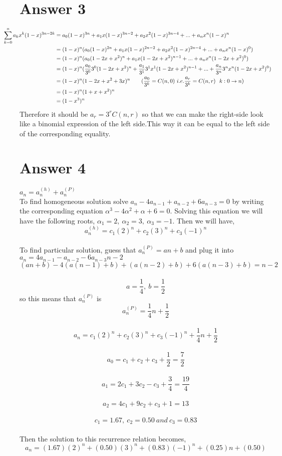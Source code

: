 \documentclass[12pt]{article}
\begin{document}
\section*{Answer 3}
\begin{equation} 
\begin{split}
\hspace{-1cm}
\sum\limits_{k=0}^{n}a_kx^k(1-x)^{3n-2k} 
& =a_0(1-x)^{3n}+a_1x(1-x)^{3n-2}+a_2x^2(1-x)^{3n-4}+...+a_nx^n(1-x)^n\\
& =(1-x)^n(a_0(1-x)^{2n}+a_1x(1-x)^{2n-2}+a_2x^2(1-x)^{2n-4}+...+a_nx^n(1-x)^0)\\
& =(1-x)^n(a_0(1-2x+x^2)^{n}+a_1x(1-2x+x^2)^{n-1}+...+a_nx^n(1-2x+x^2)^0)\\
& =(1-x)^n(\frac{a_0}{3^0}3^0(1-2x+x^2)^{n}+\frac{a_1}{3^1}3^1x^1(1-2x+x^2)^{n-1}+...+\frac{a_n}{3^n}3^nx^n(1-2x+x^2)^0)\\
& =(1-x)^n(1-2x+x^2+3x)^n \qquad (\frac{a_0}{3^k}=C(n,0)\ i.e. \frac{a_r}{3^k}=C(n,r)\ \ k:0 \rightarrow n)\\ 
& =(1-x)^n(1+x+x^2)^n \\
& =(1-x^3)^n 
\end{split}
\end{equation}
Therefore it should be $a_r=3^rC(n,r)$ so that we can make the right-side look like a binomial expression of the left side.This way it can be equal to the left side of the corresponding equality.
\section*{Answer 4}
\vspace{0.5cm}
$a_n=a_n^{(h)}+a_n^{(P)}$ \\
\vspace{0.1cm}
\hspace{1cm}
To find homogeneous solution solve $a_n-4a_{n-1}+a_{n-2}+6a_{n-3}=0$ by writing the corresponding equation $\alpha^3-4\alpha^2+\alpha+6=0$. Solving this equation we will have the following roots, $\alpha_1=2,\ \alpha_2=3,\ \alpha_3=-1$. Then we will have, \\
$$a_n^{(h)}  = c_1(2)^n+c_2(3)^n+c_3(-1)^n$$ \\
To find particular solution, guess that $a_n^{(P)}=an+b$ and plug it into $a_n=4a_{n-1}-a_{n-2}-6a_{n-3}n-2$ \\
$$(an+b)-4(a(n-1)+b)+(a(n-2)+b)+6(a(n-3)+b)=n-2$$\\
$$a=\frac{1}{4},\ b=\frac{1}{2}$$\qquad so this means that $a_n^{(P)}$ is $$a_n^{(P)}=\frac{1}{4}n+\frac{1}{2}$$ \\
$$a_n  = c_1(2)^n+c_2(3)^n+c_3(-1)^n+\frac{1}{4}n+\frac{1}{2}$$\\
$$a_0=c_1+c_2+c_3+\frac{1}{2}=\frac{7}{2}$$\\
$$a_1=2c_1+3c_2-c_3+\frac{3}{4}=\frac{19}{4}$$\\
$$a_2=4c_1+9c_2+c_3+1=13$$\\
$$ c_1=1.67,\ c_2=0.50 \ and\ c_3=0.83$$\\
Then the solution to this recurrence relation becomes,\\
$$a_n=(1.67)(2)^n+(0.50)(3)^n+(0.83)(-1)^n+(0.25)n+(0.50) $$\\
\end{document}
